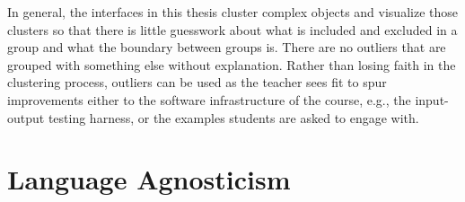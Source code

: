 \documentclass[12pt,twoside]{mitthesis}
\providecommand{\DIFdelbegin}{} %
\providecommand{\DIFdelend}{} %
\begin{document}

In general, the interfaces in this thesis cluster complex objects and visualize those clusters so that there is little guesswork about what is included and excluded in a group and what the boundary between groups is. There are no outliers that are grouped with something else without explanation. Rather than losing faith in the clustering process, outliers can be used as the teacher sees fit to spur improvements either to the software infrastructure of the course, e.g., the input-output testing harness, or the examples students are asked to engage with. 

\DIFdelbegin %



\DIFdelend \section{Language Agnosticism}
\end{document}
